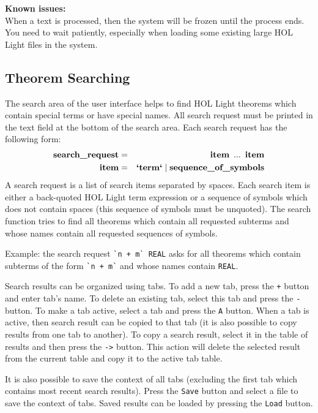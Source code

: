 \documentclass[a4paper]{article}
\newcommand{\issues}{{\bf Known issues:}\\}
\newcommand{\xx}[1]{\mathop{\text{\bf #1}}}
\begin{document}
\issues
When a text is processed, then the system will be frozen until the process ends. You need to wait patiently, especially when loading some existing large HOL Light files in the system.

\subsection{Theorem Searching}
The search area of the user interface helps to find HOL Light theorems which contain special terms or have special names. All search request must be printed in the text field at the bottom of the search area. Each search request has the following form:
\begin{eqnarray*}
\xx{search\_request} &=& \xx{item}\ ...\ \xx{item}\\
\xx{item} &=& \xx{`term`} \mathrel{|} \xx{sequence\_of\_symbols}
\end{eqnarray*}
A search request is a list of search items separated by spaces. Each search item is either a back-quoted HOL Light term expression or a sequence of symbols which does not contain spaces (this sequence of symbols must be unquoted). The search function tries to find all theorems which contain all requested subterms and whose names contain all requested sequences of symbols.

Example: the search request \verb|`n + m` REAL| asks for all theorems which contain subterms of the form \verb|`n + m`| and whose names contain \verb|REAL|.

Search results can be organized using tabs. To add a new tab, press the \verb|+| button and enter tab's name. To delete an existing tab, select this tab and press the \verb|-| button. To make a tab active, select a tab and press the \verb|A| button. When a tab is active, then search result can be copied to that tab (it is also possible to copy results from one tab to another). To copy a search result, select it in the table of results and then press the \verb|->| button. This action will delete the selected result from the current table and copy it to the active tab table.

It is also possible to save the context of all tabs (excluding the first tab which contains most recent search results). Press the {\tt Save} button and select a file to save the context of tabs. Saved results can be loaded by pressing the {\tt Load} button.





\end{document}
